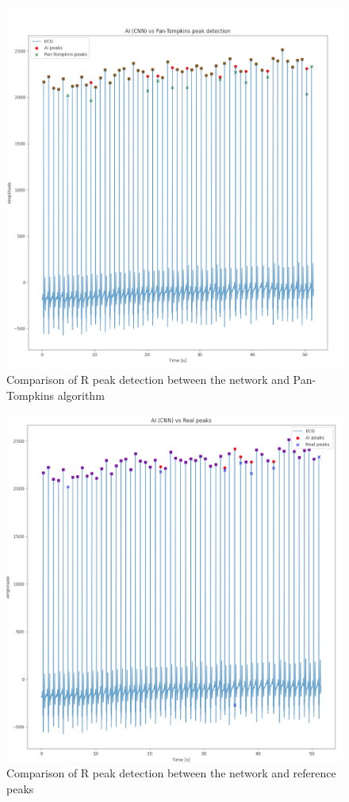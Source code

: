 \documentclass{citask}
\begin{document}
\begin{figure}[htbp]
    \centering
    \includegraphics[scale=0.2]{images/ai_pan-tompkins.png}
    \caption{Comparison of R peak detection between the network and Pan-Tompkins algorithm}
    \label{fig:ai_pan-tompkins}
\end{figure}

\begin{figure}[htbp]
    \centering
    \includegraphics[scale=0.2]{images/ai_real_peaks.png}
    \caption{Comparison of R peak detection between the network and reference peaks}
    \label{fig:ai_real_peaks}
\end{figure}
\end{document}

